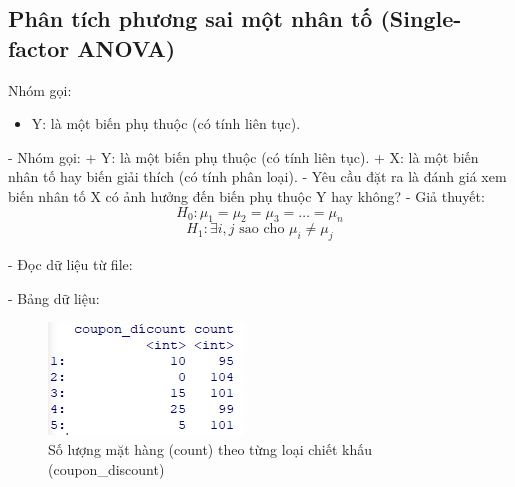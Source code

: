 \subsection{Phân tích phương sai một nhân tố (Single-factor ANOVA)}


Nhóm gọi:
\begin{itemize}
    \item Y: là một biến phụ thuộc (có tính liên tục).
\end{itemize}

- Nhóm gọi:
  + Y: là một biến phụ thuộc (có tính liên tục).
  + X: là một biến nhân tố hay biến giải thích (có tính phân loại).
- Yêu cầu đặt ra là đánh giá xem biến nhân tố X có ảnh hưởng đến biến phụ thuộc Y hay không?
- Giả thuyết:
  \[
  H_{0}: \mu_{1} = \mu_{2} = \mu_{3} = \dots = \mu_{n}
  \]
  \[
  H_{1}: \exists i, j \text{ sao cho } \mu_{i} \neq \mu_{j}
  \]

- Đọc dữ liệu từ file:

- Bảng dữ liệu:

\begin{figure}[!htbp]
    \centering
    \includegraphics[width=0.4\linewidth]{graphics/5.3.1.png}
    \caption{Số lượng mặt hàng (count) theo từng loại chiết khấu (coupon\_discount)}
\end{figure}
